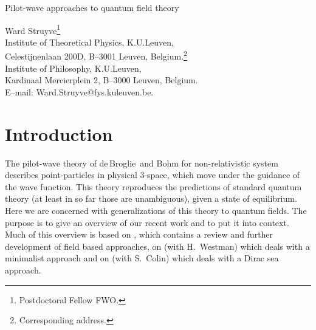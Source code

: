 \documentclass[11pt]{article}
\newcommand{\db}{de$\,$Broglie}
\begin{document}
\vspace*{1.0cm}
\noindent
{\bf
{\large
\begin{center}
Pilot-wave approaches to quantum field theory
\end{center}
}
}



\vspace*{.5cm}
\begin{center}
Ward Struyve{\footnote{Postdoctoral Fellow FWO.}}\\
Institute of Theoretical Physics, K.U.Leuven,\\
Celestijnenlaan 200D, B--3001 Leuven, Belgium.{\footnote{Corresponding address.}}\\
Institute of Philosophy, K.U.Leuven,\\
Kardinaal Mercierplein 2, B--3000 Leuven, Belgium.\\
E--mail: Ward.Struyve@fys.kuleuven.be.
\end{center}


\begin{abstract}
\noindent
The purpose of this paper is to present an overview of recent work on pilot-wave approaches to quantum field theory. In such approaches, systems are not only described by their wave function, as in standard quantum theory, but also by some additional variables. In the non-relativistic pilot-wave theory of \db\ and Bohm those variables are particle positions. In the context of quantum field theory, there are two natural choices, namely particle positions and fields. The incorporation of those variables makes it possible to provide an objective description of nature in which rather ambiguous notions such as `measurement' and `observer' play no fundamental role. As such, the theory is free of the conceptual difficulties, such as the measurement problem, that plague standard quantum theory.
\end{abstract}



\section{Introduction}
The pilot-wave theory of \db\ and Bohm for non-relativistic system describes point-particles in physical 3-space, which move under the guidance of the wave function. This theory reproduces the predictions of standard quantum theory (at least in so far those are unambiguous), given a state of equilibrium. Here we are concerned with generalizations of this theory to quantum fields. The purpose is to give an overview of our recent work and to put it into context. Much of this overview is based on \cite{struyve10}, which contains a review and further development of field based approaches, on \cite{struyve06,struyve07b} (with H.\ Westman) which deals with a minimalist approach and on \cite{colin07} (with S.\ Colin) which deals with a Dirac sea approach.
\end{document}
